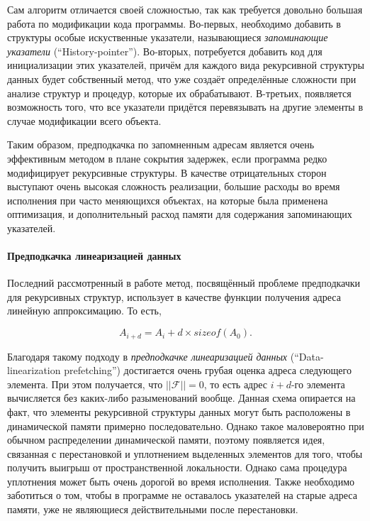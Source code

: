 \documentclass[12pt,a4paper]{article}
\begin{document}
Сам алгоритм отличается своей сложностью, так как требуется довольно большая работа по модификации кода программы. Во-первых, необходимо добавить в структуры особые искуственные указатели, называющиеся \emph{запоминающие указатели} (``History-pointer''). Во-вторых, потребуется добавить код для инициализации этих указателей, причём для каждого вида рекурсивной структуры данных будет собственный метод, что уже создаёт определённые сложности при анализе структур и процедур, которые их обрабатывают. В-третьих, появляется возможность того, что все указатели придётся перевязывать на другие элементы в случае модификации всего объекта.

Таким образом, предподкачка по запомненным адресам является очень эффективным методом в плане сокрытия задержек, если программа редко модифицирует рекурсивные структуры. В качестве отрицательных сторон выступают очень высокая сложность реализации, большие расходы во время исполнения при часто меняющихся объектах, на которые была применена оптимизация, и дополнительный расход памяти для содержания запоминающих указателей.

\paragraph{Предподкачка линеаризацией данных}

Последний рассмотренный в работе метод, посвящённый проблеме предподкачки для рекурсивных структур, использует в качестве функции получения адреса линейную аппроксимацию. То есть,

\begin{displaymath}
  A_{i+d} = A_i + d \times sizeof(A_0).
\end{displaymath}

Благодаря такому подходу в \emph{предподкачке линеаризацией данных} (``Data-linearization prefetching'') достигается очень грубая оценка адреса следующего элемента. При этом получается, что $||\mathcal{F}|| = 0$, то есть адрес $i+d$-го элемента вычисляется без каких-либо разыменований вообще. Данная схема опирается на факт, что элементы рекурсивной структуры данных могут быть расположены в динамической памяти примерно последовательно. Однако такое маловероятно при обычном распределении динамической памяти, поэтому появляется идея, связанная с перестановкой и уплотнением выделенных элементов для того, чтобы получить выигрыш от пространственной локальности. Однако сама процедура уплотнения может быть очень дорогой во время исполнения. Также необходимо заботиться о том, чтобы в программе не оставалось указателей на старые адреса памяти, уже не являющиеся действительными после перестановки.
\end{document}
